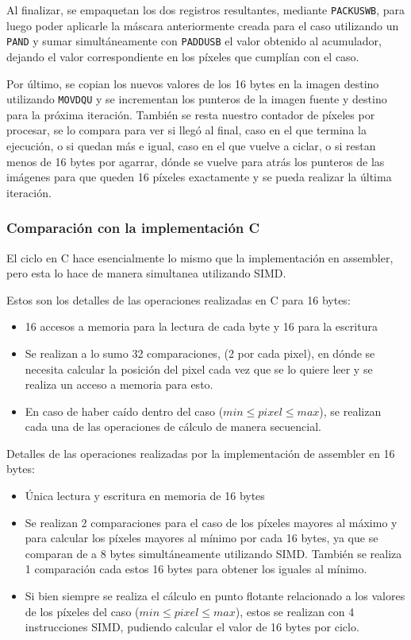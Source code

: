 Al finalizar, se empaquetan los dos registros resultantes, mediante \texttt{PACKUSWB}, para luego poder aplicarle la máscara anteriormente creada para el caso utilizando un \texttt{PAND} y sumar simultáneamente con \texttt{PADDUSB} el valor obtenido al acumulador, dejando el valor correspondiente en los píxeles que cumplían con el caso.

Por último, se copian los nuevos valores de los 16 bytes en la imagen destino utilizando \texttt{MOVDQU} y se incrementan los punteros de la imagen fuente y destino para la próxima iteración. También se resta nuestro contador de píxeles por procesar, se lo compara para ver si llegó al final, caso en el que termina la ejecución, o si quedan más e igual, caso en el que vuelve a ciclar, o si restan menos de 16 bytes por agarrar, dónde se vuelve para atrás los punteros de las imágenes para que queden 16 píxeles exactamente y se pueda realizar la última iteración.

\subsubsection{Comparación con la implementación C}
El ciclo en C hace esencialmente lo mismo que la implementación en assembler, pero esta lo hace de manera simultanea utilizando SIMD. 

Estos son los detalles de las operaciones realizadas en C para 16 bytes:
\begin{itemize}
\item 16 accesos a memoria para la lectura de cada byte y 16 para la escritura
\item Se realizan a lo sumo 32 comparaciones, (2 por cada pixel), en dónde se necesita calcular la posición del pixel cada vez que se lo quiere leer y se realiza un acceso a memoria para esto.
\item En caso de haber caído dentro del caso ($min \leq pixel \leq max$), se realizan cada una de las operaciones de cálculo de manera secuencial.
\end{itemize}
Detalles de las operaciones realizadas por la implementación de assembler en 16 bytes:
\begin{itemize}
\item Única lectura y escritura en memoria de 16 bytes
\item Se realizan 2 comparaciones para el caso de los píxeles mayores al máximo y para calcular los píxeles mayores al mínimo por cada 16 bytes, ya que se comparan de a 8 bytes simultáneamente utilizando SIMD. También se realiza 1 comparación cada estos 16 bytes para obtener los iguales al mínimo.
\item Si bien siempre se realiza el cálculo en punto flotante relacionado a los valores de los píxeles del caso ($min \leq pixel \leq max$), estos se realizan con 4 instrucciones SIMD, pudiendo calcular el valor de 16 bytes por ciclo.
\end{itemize}

